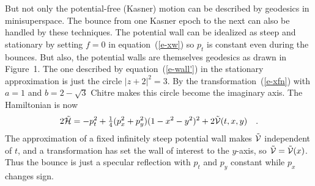 But not only the potential-free (Kasner) motion can be described by
geodesics in minisuperspace.  The bounce from one Kasner
epoch to the next can also be handled by these techniques.  The
potential wall can be idealized as steep and stationary by setting
$f=0$ in equation~(\ref{e-xw}) so $p_t$ is constant even during the
bounces.  But also, the potential walls are themselves geodesics as
drawn in Figure~1.
The one described by equation~(\ref{e-wall'}) in the stationary
approximation is just the circle $|z+2|^2 = 3$.  By the
transformation~(\ref{e-xfn}) with $a=1$ and $b = 2-\sqrt{3}$ Chitre
makes this circle become the imaginary axis.  The Hamiltonian is now
\begin{equation}\label{e-Hxy}
  2\tilde{{\cal H}} = - p_t^2
  + \mbox{$\frac{1}{4}$}(p_x^2 + p_y^2)(1-x^2-y^2)^2
			    + 2\tilde{{\cal V}}(t,x,y) \quad .
\end{equation}
The approximation of a fixed infinitely steep potential wall makes
$\tilde{{\cal V}}$ independent of $t$, and a transformation has set
the wall of interest to the $y$-axis, so $\tilde{{\cal V}} = \tilde{{\cal
V}}(x)$.  Thus the bounce is just a specular reflection with
$p_t$ and $p_y$ constant while $p_x$ changes sign.

